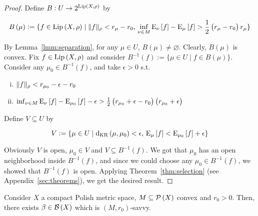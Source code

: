 \begin{proof}

Define $B: U \rightarrow 2^{{\operatorname{Lip}}\left(X,\rho\right)}$ by

$$B\left(\mu\right):=\{f \in {\operatorname{Lip}}\left(X,\rho\right) \mid \lVert f \rVert_\rho < r_\mu - r_0,\, \inf_{\nu \in M} \operatorname{E}_\nu\left[f\right] - \operatorname{E}_\mu\left[f\right] > \frac{1}{2}\left(r_\mu - r_0\right) r_\mu\}$$

By Lemma~\ref{lmm:separation}, for any $\mu \in U$, $B\left(\mu\right) \ne \varnothing$. Clearly, $B\left(\mu\right)$ is convex. Fix $f \in {\operatorname{Lip}}\left(X,\rho\right)$ and consider $B^{-1}\left(f\right):=\{\mu \in U \mid f \in B\left(\mu\right)\}$. Consider any $\mu_0 \in B^{-1}\left(f\right)$, and take $\epsilon > 0$ s.t.

\begin{enumerate}[i.]

\item $\lVert f \rVert_\rho < r_{\mu_0}  - \epsilon - r_0$
\item $\inf_{\nu \in M} \operatorname{E}_\nu\left[f\right] - \operatorname{E}_{\mu_0}\left[f\right] -\epsilon > \frac{1}{2}\left(r_{\mu_0} + \epsilon  - r_0\right) \left(r_{\mu_0} + \epsilon\right)$

\end{enumerate}

Define $V \subseteq U$ by 

$$V := \{\mu \in U \mid \operatorname{d}_{\textnormal{KR}}\left(\mu,\mu_0\right) < \epsilon,\, \operatorname{E}_\mu\left[f\right] < \operatorname{E}_{\mu_0}\left[f\right] + \epsilon\}$$

Obviously $V$ is open, $\mu_0\in V$ and $V \subseteq B^{-1}\left(f\right)$. We got that $\mu_0$ has an open neighborhood inside $B^{-1}(f)$, and since we could choose any $\mu_0\in B^{-1}(f)$, we showed that $B^{-1}\left(f\right)$ is open. Applying Theorem~\ref{thm:selection} (see Appendix~\ref{sec:theorems}), we get the desired result.
\end{proof}

\begin{samepage}
\begin{corollary}
\label{crl:savvy}

Consider $X$ a compact Polish metric space, $M \subseteq \mathcal{P}\left(X\right)$ convex and $r_0 > 0$. Then, there exists $\beta \in \mathcal{B}\left(X\right)$ which is $\left(M,r_0\right)$-savvy.

\end{corollary}
\end{samepage}

